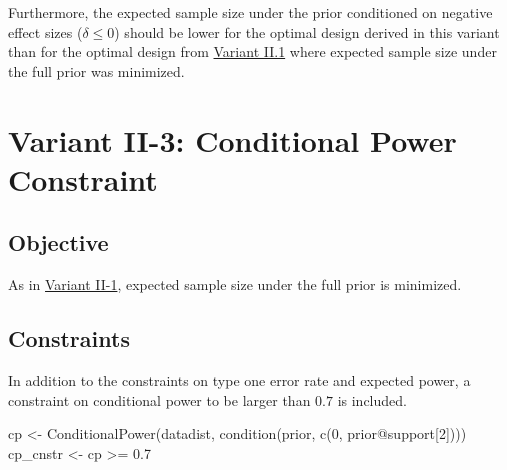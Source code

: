 \documentclass[
]{book}
\newenvironment{Shaded}{\begin{snugshade}}{\end{snugshade}}
\newcommand{\DecValTok}[1]{\textcolor[rgb]{0.00,0.00,0.81}{#1}}
\newcommand{\FloatTok}[1]{\textcolor[rgb]{0.00,0.00,0.81}{#1}}
\newcommand{\FunctionTok}[1]{\textcolor[rgb]{0.00,0.00,0.00}{#1}}
\newcommand{\NormalTok}[1]{#1}
\newcommand{\OtherTok}[1]{\textcolor[rgb]{0.56,0.35,0.01}{#1}}
\newcommand{\SpecialCharTok}[1]{\textcolor[rgb]{0.00,0.00,0.00}{#1}}
\newcommand{\StringTok}[1]{\textcolor[rgb]{0.31,0.60,0.02}{#1}}
\begin{document}
Furthermore, the expected sample size under the prior conditioned on negative
effect sizes (\(\delta \leq 0\)) should be lower for the optimal design derived
in this variant than for the optimal design from \protect\hyperlink{variantII_1}{Variant II.1}
where expected sample size under the full prior was minimized.

\begin{Shaded}
\end{Shaded}

\hypertarget{variantII_3}{%
\section{Variant II-3: Conditional Power Constraint}\label{variantII_3}}

\hypertarget{objective-5}{%
\subsection{Objective}\label{objective-5}}

As in \protect\hyperlink{variantII_1}{Variant II-1}, expected sample size under the full prior
is minimized.

\hypertarget{constraints-5}{%
\subsection{Constraints}\label{constraints-5}}

In addition to the constraints on type one error rate and expected power,
a constraint on conditional power to be larger than \(0.7\) is included.

\begin{Shaded}
\begin{Highlighting}[]
\NormalTok{cp       }\OtherTok{\textless{}{-}} \FunctionTok{ConditionalPower}\NormalTok{(datadist, }\FunctionTok{condition}\NormalTok{(prior, }\FunctionTok{c}\NormalTok{(}\DecValTok{0}\NormalTok{, prior}\SpecialCharTok{@}\NormalTok{support[}\DecValTok{2}\NormalTok{])))}
\NormalTok{cp\_cnstr }\OtherTok{\textless{}{-}}\NormalTok{ cp }\SpecialCharTok{\textgreater{}=} \FloatTok{0.7}
\end{Highlighting}
\end{Shaded}
\end{document}
